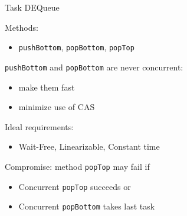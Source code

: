 \begin{frame}{Task DEQueue}

Methods:
\begin{itemize}
  \item \texttt{pushBottom}, \texttt{popBottom}, \texttt{popTop}
\end{itemize}

\pause
\texttt{pushBottom} and \texttt{popBottom} are never concurrent:
\begin{itemize}
  \pause \item make them fast
  \pause \item minimize use of CAS
\end{itemize}

\pause
Ideal requirements:
\begin{itemize}
  \item Wait-Free, Linearizable, Constant time
\end{itemize}

\pause

Compromise: \pause method \texttt{popTop} may fail if \pause
\begin{itemize}
  \item Concurrent \texttt{popTop} succeeds or 
  \item Concurrent \texttt{popBottom} takes last task  
\end{itemize}

\end{frame}


